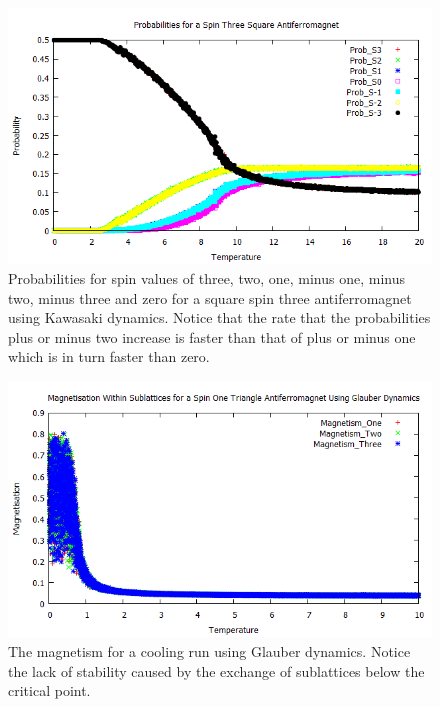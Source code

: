 \documentclass[]{article}
\begin{document}
\begin{figure}[h]
\begin{center}
\includegraphics[scale=0.75]{Spin_3}
\caption{Probabilities for spin values of three, two, one, minus one, minus two, minus three and zero for a square spin three antiferromagnet using Kawasaki dynamics. Notice that the rate that the probabilities plus or minus two increase is faster than that of plus or minus one which is in turn faster than zero.}
\label{Spin_3}
\end{center}
\end{figure}

\begin{figure}
\begin{center}
\includegraphics[scale=0.75]{Mag_G}
\caption{The magnetism for a cooling run using Glauber dynamics. Notice the lack of stability caused by the exchange of
sublattices below the critical point.}
\label{Mag_G}
\end{center}
\end{figure}
\end{document}
